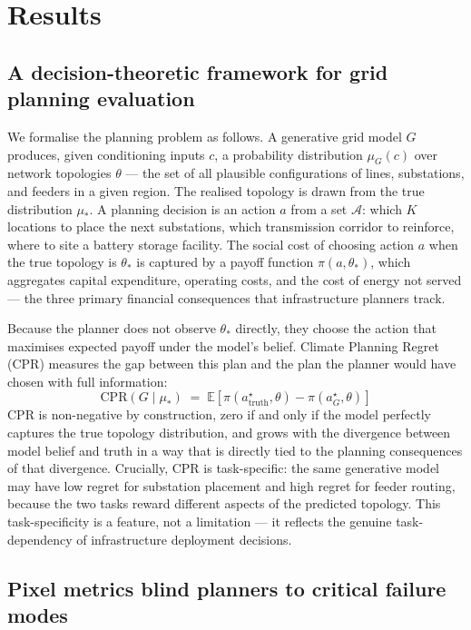 \documentclass[10pt,a4paper]{article}
\begin{document}
\section{Results}

\subsection{A decision-theoretic framework for grid planning evaluation}

We formalise the planning problem as follows. A generative grid
model $G$ produces, given conditioning inputs $c$, a probability
distribution $\mu_G(c)$ over network topologies $\theta$ --- the
set of all plausible configurations of lines, substations, and
feeders in a given region. The realised topology is drawn from
the true distribution $\mu_*$. A planning decision is an action
$a$ from a set $\mathcal{A}$: which $K$ locations to place the
next substations, which transmission corridor to reinforce, where
to site a battery storage facility. The social cost of choosing
action $a$ when the true topology is $\theta_*$ is captured by a
payoff function $\pi(a, \theta_*)$, which aggregates capital
expenditure, operating costs, and the cost of energy not served
--- the three primary financial consequences that infrastructure
planners track.

Because the planner does not observe $\theta_*$ directly, they
choose the action that maximises expected payoff under the model's
belief. Climate Planning Regret (CPR) measures the gap between
this plan and the plan the planner would have chosen with full
information:
\[
  \mathrm{CPR}(G \mid \mu_*) \;=\; \mathbb{E}\!\left[\pi(a^\star_{\text{truth}}, \theta) - \pi(a^\star_G, \theta)\right]
\]
CPR is non-negative by construction, zero if and only if the model
perfectly captures the true topology distribution, and grows with
the divergence between model belief and truth in a way that is
directly tied to the planning consequences of that divergence.
Crucially, CPR is task-specific: the same generative model may
have low regret for substation placement and high regret for
feeder routing, because the two tasks reward different aspects of
the predicted topology. This task-specificity is a feature, not a
limitation --- it reflects the genuine task-dependency of
infrastructure deployment decisions.

\subsection{Pixel metrics blind planners to critical failure modes}
\end{document}
